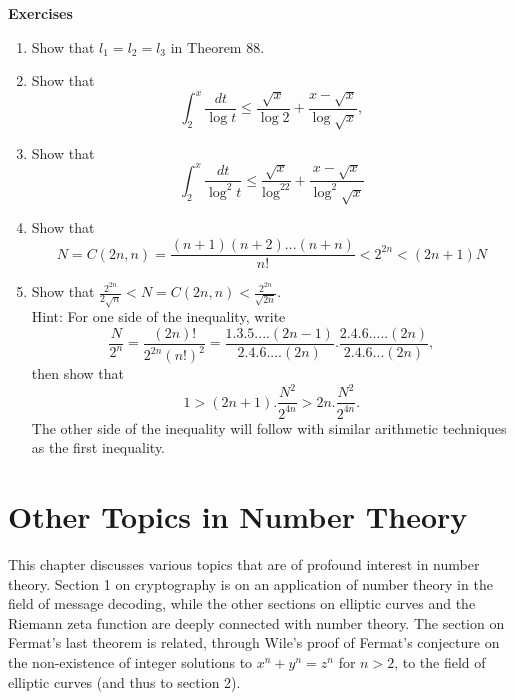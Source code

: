 \documentclass[12pt,letterpaper]{book}
\begin{document}
\textbf{Exercises}
\begin{enumerate}
\item{Show that $l_1=l_2=l_3$ in Theorem 88.}
\item{ Show that \begin{equation*}
\int_2^x\frac{dt}{\log t}\leq \frac{\sqrt{x}}{\log
2}+\frac{x-\sqrt{x}}{\log \sqrt{x}},
\end{equation*}}
\item{Show that \begin{equation*}
\int_2^x\frac{dt}{\log^2t}\leq
\frac{\sqrt{x}}{\log^22}+\frac{x-\sqrt{x}}{\log^2\sqrt{x}}
\end{equation*}}
\item{Show that \begin{equation*}
N=C(2n,n)=\frac{(n+1)(n+2)...(n+n)}{n!}<2^{2n}<(2n+1)N
\end{equation*}}
\item{Show that $\frac{2^{2n}}{2\sqrt{n}}<N=C(2n,n)< \frac{2^{2n}}{\sqrt{2n}}$. \\ Hint: For one side of the inequality,
write
\begin{equation*}
\frac{N}{2^n}=\frac{(2n)!}{2^{2n}(n!)^2}=\frac{1.3.5....(2n-1)}{2.4.6....(2n)}.\frac{2.4.6.....(2n)}{2.4.6...(2n)},
\end{equation*}
then show that
\begin{equation*}
1>(2n+1).\frac{N^2}{2^{4n}}>2n.\frac{N^2}{2^{4n}}.
\end{equation*}
The other side of the inequality will follow with similar arithmetic
techniques as the first inequality.}

\end{enumerate}

\chapter{Other Topics in Number Theory}

This chapter discusses various topics that are of profound interest in number theory. Section 1 on cryptography is on an
application of number theory in the field of message decoding, while the other sections on elliptic curves and the
Riemann zeta function are deeply connected with number theory. The section on Fermat's last theorem is related,
through Wile's proof of Fermat's conjecture on the non-existence of integer solutions to $x^n+y^n=z^n$ for $n>2$, to the
field of elliptic curves (and thus to section 2).


\end{document}

